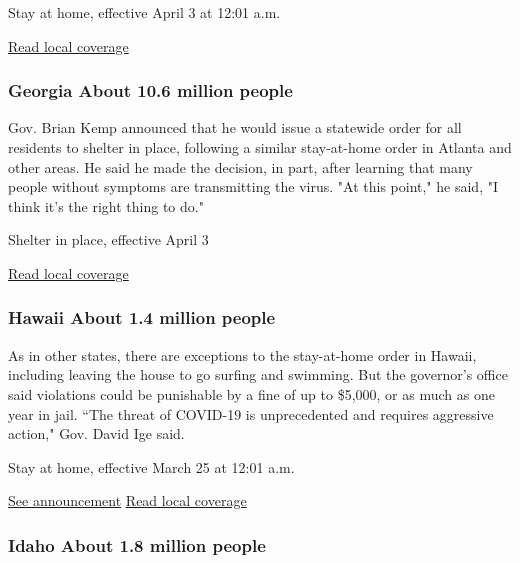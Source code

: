 Stay at home, effective April 3 at 12:01 a.m.

\href{https://www.tampabay.com/news/health/2020/04/01/florida-gov-ron-desantis-issues-statewide-stay-at-home-order/}{Read
local coverage}

\hypertarget{georgia-about-106-million-people}{%
\subsubsection{Georgia About 10.6 million
people}\label{georgia-about-106-million-people}}

Gov. Brian Kemp announced that he would issue a statewide order for all
residents to shelter in place, following a similar stay-at-home order in
Atlanta and other areas. He said he made the decision, in part, after
learning that many people without symptoms are transmitting the virus.
"At this point," he said, "I think it's the right thing to do."

Shelter in place, effective April 3

\href{https://www.ajc.com/blog/politics/breaking-georgia-governor-orders-shelter-place-curb-coronavirus/vdAoWkjq39W2usr9e8W8BL/}{Read
local coverage}

\hypertarget{hawaii-about-14-million-people}{%
\subsubsection{Hawaii About 1.4 million
people}\label{hawaii-about-14-million-people}}

As in other states, there are exceptions to the stay-at-home order in
Hawaii, including leaving the house to go surfing and swimming. But the
governor's office said violations could be punishable by a fine of up to
\$5,000, or as much as one year in jail. ``The threat of COVID-19 is
unprecedented and requires aggressive action," Gov. David Ige said.

Stay at home, effective March 25 at 12:01 a.m.

\href{https://governor.hawaii.gov/wp-content/uploads/2020/03/2003162-ATG_Third-Supplementary-Proclamation-for-COVID-19-signed.pdf}{See
announcement} \textbar{}
\href{https://www.hawaiinewsnow.com/2020/03/24/live-governor-expected-issue-statewide-stay-at-home-order-coronavirus-cases-swell/}{Read
local coverage}

\hypertarget{idaho-about-18-million-people}{%
\subsubsection{Idaho About 1.8 million
people}\label{idaho-about-18-million-people}}

